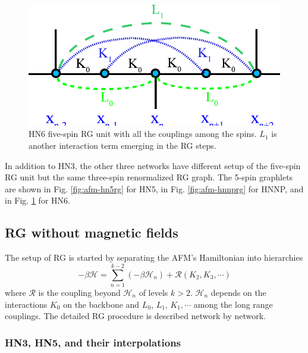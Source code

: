 \begin{figure}
\centering \includegraphics[scale=0.68]{Chapter-3/IsingRG_HN6_before}
\protect\caption{HN6 five-spin RG unit with all the couplings among the spins. $L_1$ is another interaction term emerging in the RG steps.}
\label{fig:afm-hn6rg}
\end{figure}

In addition to HN3, the other three networks have different setup of the five-spin RG unit but the same three-spin renormalized RG graph. The 5-spin graphlets are shown in Fig. \ref{fig:afm-hn5rg} \cite{Boettcher2011HNNP} for HN5, in Fig. \ref{fig:afm-hnnprg}  \cite{Boettcher2011HNNP} for HNNP, and in Fig. \ref{fig:afm-hn6rg} \cite{Boettcher2011HNNP} for HN6. 



\subsection{RG without magnetic fields}
The setup of RG is started by separating the AFM's Hamiltonian into hierarchies
\begin{equation}
-\beta\mathcal{H} = \sum_{n=1}^{k-2} (-\beta \mathcal{H}_n)+ \mathcal{R}(K_2, K_3, \cdots)
\end{equation}
where $\mathcal{R}$ is the coupling beyond $\mathcal{H}_n$ of levels $k>2$. $\mathcal{H}_n$ depends on the interactions $K_0$ on the backbone and $L_0$, $L_1$, $K_1, \cdots$ among the long range couplings. The detailed RG procedure is described network by network. 

\subsubsection{HN3, HN5, and their interpolations }
\label{sec:afm-HN35RG}

